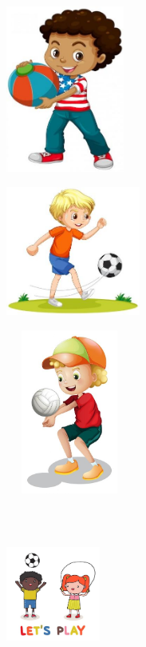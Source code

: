 \begin{escolha}
\item \includegraphics[width=1.53194in,height=2.16250in]{media/image199.jpg}

\item \includegraphics[width=1.73760in,height=1.66822in]{media/image200.jpg}

\item \includegraphics[width=1.65208in,height=2.13056in]{media/image201.jpg}

\item \includegraphics[width=1.21736in,height=2.20972in]{media/image202.jpg}
\end{escolha}


